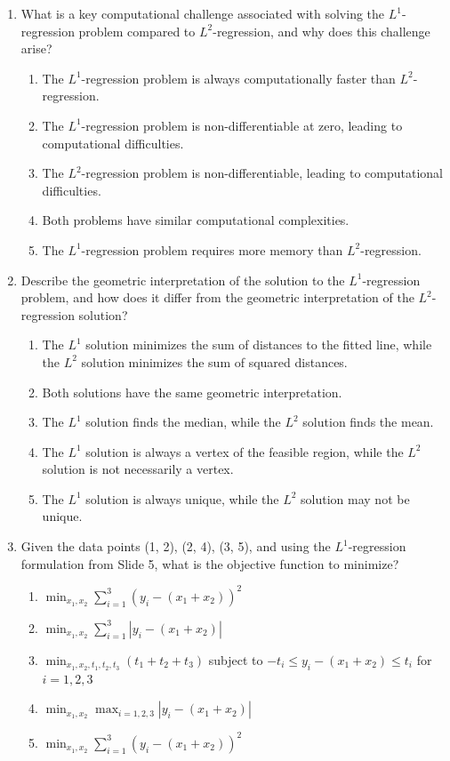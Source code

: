 \documentclass{article}%
\begin{document}
\begin{enumerate}
\begin{enumerate}
\end{enumerate}%
\vspace{1em}%
\item What is a key computational challenge associated with solving the $L^1$-regression problem compared to $L^2$-regression, and why does this challenge arise?%
\begin{enumerate}%
\item The $L^1$-regression problem is always computationally faster than $L^2$-regression.%
\item The $L^1$-regression problem is non-differentiable at zero, leading to computational difficulties.%
\item The $L^2$-regression problem is non-differentiable, leading to computational difficulties.%
\item Both problems have similar computational complexities.%
\item The $L^1$-regression problem requires more memory than $L^2$-regression.%
\end{enumerate}%
\vspace{1em}%
\item Describe the geometric interpretation of the solution to the $L^1$-regression problem, and how does it differ from the geometric interpretation of the $L^2$-regression solution?%
\begin{enumerate}%
\item The $L^1$ solution minimizes the sum of distances to the fitted line, while the $L^2$ solution minimizes the sum of squared distances.%
\item Both solutions have the same geometric interpretation.%
\item The $L^1$ solution finds the median, while the $L^2$ solution finds the mean.%
\item The $L^1$ solution is always a vertex of the feasible region, while the $L^2$ solution is not necessarily a vertex.%
\item The $L^1$ solution is always unique, while the $L^2$ solution may not be unique.%
\end{enumerate}%
\vspace{1em}%
\item Given the data points (1, 2), (2, 4), (3, 5), and using the $L^1$-regression formulation from Slide 5, what is the objective function to minimize?%
\begin{enumerate}%
\item $ \min_{x_1, x_2} \sum_{i=1}^3 (y_i - (x_1 + x_2))^2$%
\item $ \min_{x_1, x_2} \sum_{i=1}^3 |y_i - (x_1 + x_2)|$%
\item $ \min_{x_1, x_2, t_1, t_2, t_3} (t_1 + t_2 + t_3)$ subject to $-t_i \le y_i - (x_1 + x_2) \le t_i$ for $i = 1, 2, 3$%
\item $ \min_{x_1, x_2} \max_{i=1,2,3} |y_i - (x_1 + x_2)|$%
\item $ \min_{x_1, x_2} \sum_{i=1}^3 (y_i - (x_1 + x_2))^2$%
\end{enumerate}%
\vspace{1em}%
\end{enumerate}
\end{document}
